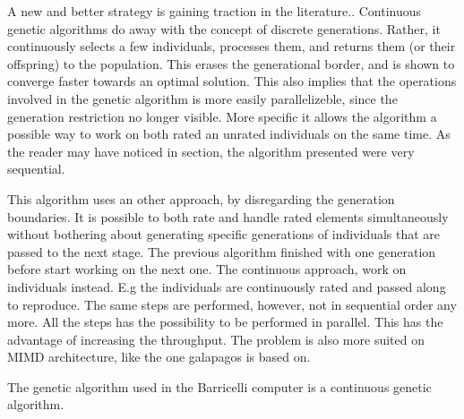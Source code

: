 A new and better strategy is gaining traction in the literature..
Continuous genetic algorithms do away with the concept of discrete generations.
Rather, it continuously selects a few individuals, processes them, and returns them (or their offspring) to the population.
This erases the generational border, and is shown  to converge faster towards an optimal solution. This also implies that the operations involved in the genetic algorithm is  more easily parallelizeble, since the generation restriction no longer visible. More specific it allows the algorithm a possible way to work on both rated an unrated individuals on the same time. As the reader may have noticed in section, the algorithm presented were very sequential. 

This algorithm uses an other approach, by disregarding the generation boundaries. It is possible to both rate and handle rated elements simultaneously without bothering about generating specific generations of individuals that are passed to the next stage. The previous algorithm finished with one generation before start working on the next one. The continuous approach, work on individuals instead. E.g the individuals are continuously rated and passed along to reproduce. The same steps are performed, however, not in sequential order any more. All the steps has the possibility to be performed in parallel. This has the advantage of increasing the throughput. The problem is also more suited on MIMD architecture, like the one galapagos is based on.      





The genetic algorithm used in the Barricelli computer is a continuous genetic algorithm.


